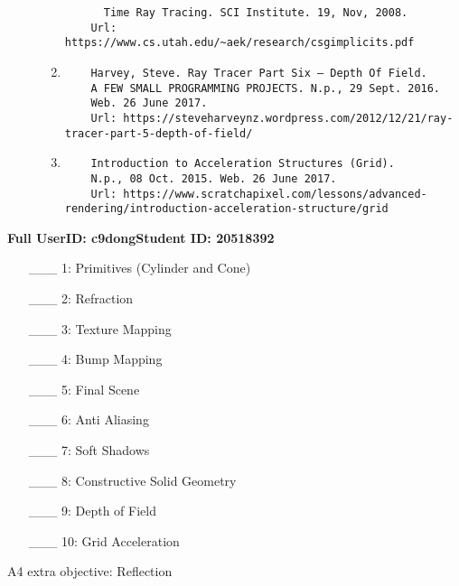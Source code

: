 \documentclass {article}
\begin{document}
\begin{description}
\begin{enumerate}
\begin{verbatim}
      Time Ray Tracing. SCI Institute. 19, Nov, 2008.
    Url: https://www.cs.utah.edu/~aek/research/csgimplicits.pdf
    \end{verbatim}
    \item
    \begin{verbatim}
    Harvey, Steve. Ray Tracer Part Six – Depth Of Field. 
    A FEW SMALL PROGRAMMING PROJECTS. N.p., 29 Sept. 2016. 
    Web. 26 June 2017.
    Url: https://steveharveynz.wordpress.com/2012/12/21/ray-tracer-part-5-depth-of-field/
    \end{verbatim}
    \item
    \begin{verbatim}
    Introduction to Acceleration Structures (Grid). 
    N.p., 08 Oct. 2015. Web. 26 June 2017.
    Url: https://www.scratchapixel.com/lessons/advanced-rendering/introduction-acceleration-structure/grid
    \end{verbatim}
    \end{enumerate}

\end{description}
\newpage



{\hfill{\bf Full UserID: c9dong}\hfill{\bf Student ID: 20518392}\hfill}

\begin{enumerate}
     \item[\_\_\_ 1:]  Primitives (Cylinder and Cone)

     \item[\_\_\_ 2:]  Refraction

     \item[\_\_\_ 3:]  Texture Mapping

     \item[\_\_\_ 4:]  Bump Mapping

     \item[\_\_\_ 5:]  Final Scene

     \item[\_\_\_ 6:]  Anti Aliasing

     \item[\_\_\_ 7:]  Soft Shadows

     \item[\_\_\_ 8:]  Constructive Solid Geometry

     \item[\_\_\_ 9:]  Depth of Field

     \item[\_\_\_ 10:]  Grid Acceleration
\end{enumerate}

A4 extra objective: Reflection
\end{document}
